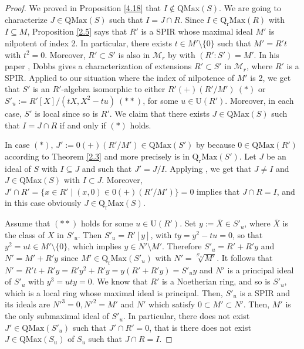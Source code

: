 \documentclass[12pt,leqno]{amsart}
\theoremstyle{definition}
\begin{document}
\begin{proof} We proved in Proposition \ref{4.18} that $I\not\in\mathrm {QMax}(S)$. We are going to characterize $J\in\mathrm{QMax}(S)$ such that $I=J\cap R$. Since $I\in\mathrm{Q_rMax}(R)$ with $I\subseteq M$, Proposition \ref{2.5} says that $R'$ is a SPIR whose maximal ideal $M'$ is nilpotent of index 2. In particular, there exists $t\in M'\setminus\{0\}$ such that $M'=R't$ with $t^2=0$. Moreover, $R'\subset S'$ is also in $\mathcal M_r$ by \cite[Proposition 4.7]{DPPS} with $(R':S')=M'$. In his paper \cite[Theorem 2.1(g)]{Dram}, Dobbs gives a characterization of extensions $R'\subset S'$ in $\mathcal M_r$, where $R'$ is a SPIR. Applied to our situation where the index of nilpotence of $M'$ is 2, we get that $S'$ is an $R'$-algebra isomorphic to either $R'(+)(R'/M')\ (*)$ or $S'_u:=R'[X]/(tX,X^ 2-tu)\ (**)$, for some $u\in\mathrm{U}(R')$. Moreover, in each case, $S'$ is local since so is $R'$. We claim that there exists $J\in\mathrm{QMax}(S)$ such that $I=J\cap R$ if and only if  $(*)$ holds. 

In case $(*)$, $J':=0(+)(R'/M')\in\mathrm{QMax}(S')$ by \cite[Theorem 6]{AKKT} because $0\in\mathrm{QMax}(R')$ according to Theorem \ref{2.3} and more precisely is in $\mathrm{Q_rMax}(S')$. Let $J$ be an ideal of $S$ with $I\subseteq J$ and such that $J'=J/I$. Applying \cite[Corollary 2]{AKKT}, we get that $J\neq I$ and $J\in\mathrm{QMax}(S)$ with $I\subset J$. Moreover, $J'\cap R'=\{x\in R'\mid(x,0)\in 0(+)(R'/M')\}=0$ implies that $J\cap R=I$, and in this case obviously $ J\in\mathrm{Q_rMax}(S)$. 

Assume that $(**)$ holds for some $u\in\mathrm{U}(R')$. Set $y:=\overline X\in S'_u$, where $\overline X$ is the class of $X$ in $S'_u$. Then $S'_u= R'[y]$, with $ty=y^2-tu=0$, so that $y^2=ut\in M'\setminus\{0\}$, which implies $y\in N'\setminus M'$. Therefore $S'_u=R'+R'y$ and $N'=M'+R'y$ since $M'\in\mathrm{Q_rMax}(S'_u)$ with $N'=\sqrt[S'_u] {M'}$. It follows that $N'=R't+R'y=R'y^2+R'y=y(R'+R'y)=S'_uy$ and $N'$ is a principal ideal of $S'_u$ with $y^3=uty=0$. We know that $R'$ is a Noetherian ring, and so is $S'_u$, which is a local ring whose maximal ideal is principal. Then, $ S'_u$ is a SPIR and its ideals are $N'^3=0,N'^2= M'$ and $N'$ which satisfy $0\subset M'\subset N'$. Then, $M'$ is the only submaximal ideal of $S'_u$. In particular, there does not exist $J'\in\mathrm{QMax}(S'_u)$ such that $J'\cap R'=0$, that is there does not exist $J\in\mathrm{QMax}(S_u)$ of $S_u$ such that $J\cap R= I$.
\end{proof}
\end{document}
